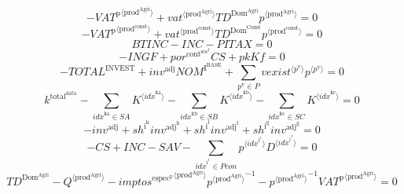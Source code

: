 \begin{equation}
-{{V\!A\!T}^{\mathrm{p}}}^{\langle \mathrm{prod}^{\mathrm{Agri}}\rangle} + {{{v\!a\!t}}^{\langle \mathrm{\mathrm{prod}^{\mathrm{Agri}}}\rangle}} {{T\!D}^{\mathrm{Dom}^{\mathrm{Agri}}}} {{p}^{\langle \mathrm{prod}^{\mathrm{Agri}}\rangle}} = 0
\end{equation}
\begin{equation}
-{{V\!A\!T}^{\mathrm{p}}}^{\langle \mathrm{prod}^{\mathrm{const}}\rangle} + {{{v\!a\!t}}^{\langle \mathrm{\mathrm{prod}^{\mathrm{const}}}\rangle}} {{T\!D}^{\mathrm{Dom}^{\mathrm{Const}}}} {{p}^{\langle \mathrm{prod}^{\mathrm{const}}\rangle}} = 0
\end{equation}
\begin{equation}
{B\!T\!I\!N\!C} - {I\!N\!C} - {P\!I\!T\!A\!X} = 0
\end{equation}
\begin{equation}
-{I\!N\!G\!F} + {{p\!o\!r}^{\mathrm{cont}^{\mathrm{soc}^{\mathrm{f}}}}} {{C\!S}} + {{p\!k}} {{K\!f}} = 0
\end{equation}
\begin{equation}
-{T\!O\!T\!A\!L}^{\mathrm{INVEST}} + {{i\!n\!v}^{\mathrm{adj}}} {{N\!O\!M}^{\mathrm{I}^{\mathrm{BASE}}}} + \sum_{p^{\mathrm{v}}\in P} {{{v\!e\!x\!i\!s\!t}}^{\langle p^{\mathrm{v}}\rangle}} {{p}^{\langle p^{\mathrm{v}}\rangle}} = 0
\end{equation}
\begin{equation}
k^{\mathrm{total}^{\mathrm{data}}} - \sum_{{i\!d\!x}^{\mathrm{ka}}\in {S\!A}} {K}^{\langle {i\!d\!x}^{\mathrm{ka}}\rangle} - \sum_{{i\!d\!x}^{\mathrm{kb}}\in {S\!B}} {K}^{\langle {i\!d\!x}^{\mathrm{kb}}\rangle} - \sum_{{i\!d\!x}^{\mathrm{kc}}\in {S\!C}} {K}^{\langle {i\!d\!x}^{\mathrm{kc}}\rangle} = 0
\end{equation}
\begin{equation}
-{i\!n\!v}^{\mathrm{adj}} + {{s\!h}^{\mathrm{i}^{\mathrm{h}}}} {{i\!n\!v}^{\mathrm{adj}^{\mathrm{h}}}} + {{s\!h}^{\mathrm{i}^{\mathrm{f}}}} {{i\!n\!v}^{\mathrm{adj}^{\mathrm{f}}}} + {{s\!h}^{\mathrm{i}^{\mathrm{g}}}} {{i\!n\!v}^{\mathrm{adj}^{\mathrm{g}}}} = 0
\end{equation}
\begin{equation}
-{C\!S} + {I\!N\!C} - {S\!A\!V} - \sum_{{i\!d\!x}^{\mathrm{i}^{\mathrm{1}}}\in {P\!c\!o\!n}} {{p}^{\langle {i\!d\!x}^{\mathrm{i}^{\mathrm{1}}}\rangle}} {{D}^{\langle {i\!d\!x}^{\mathrm{i}^{\mathrm{1}}}\rangle}} = 0
\end{equation}
\begin{equation}
{T\!D}^{\mathrm{Dom}^{\mathrm{Agri}}} - {Q}^{\langle \mathrm{prod}^{\mathrm{Agri}}\rangle} - {{{i\!m\!p\!t\!o\!s}^{\mathrm{espec}^{\mathrm{p}}}}^{\langle \mathrm{\mathrm{prod}^{\mathrm{Agri}}}\rangle}} {{p}^{\langle \mathrm{prod}^{\mathrm{Agri}}\rangle}}^{-1} - {{p}^{\langle \mathrm{prod}^{\mathrm{Agri}}\rangle}}^{-1} {{{V\!A\!T}^{\mathrm{p}}}^{\langle \mathrm{prod}^{\mathrm{Agri}}\rangle}} = 0
\end{equation}
